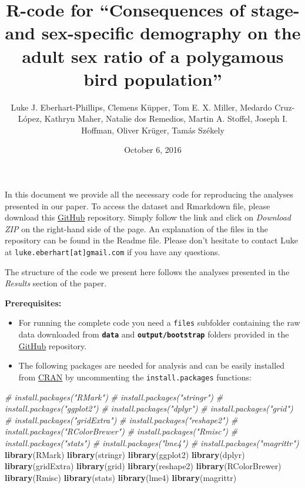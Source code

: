 \documentclass[]{article}
\title{R-code for ``Consequences of stage- and sex-specific demography on the
adult sex ratio of a polygamous bird population''}
\author{Luke J. Eberhart-Phillips, Clemens Küpper, Tom E. X. Miller, Medardo
Cruz-López, Kathryn Maher, Natalie dos Remedios, Martin A. Stoffel,
Joseph I. Hoffman, Oliver Krüger, Tamás Székely}
\date{October 6, 2016}
\newenvironment{Shaded}{\begin{snugshade}}{\end{snugshade}}
\newcommand{\KeywordTok}[1]{\textcolor[rgb]{0.13,0.29,0.53}{\textbf{{#1}}}}
\newcommand{\CommentTok}[1]{\textcolor[rgb]{0.56,0.35,0.01}{\textit{{#1}}}}
\newcommand{\NormalTok}[1]{{#1}}
\providecommand{\tightlist}{%
  \setlength{\itemsep}{0pt}\setlength{\parskip}{0pt}}
\begin{document}
\maketitle

In this document we provide all the necessary code for reproducing the
analyses presented in our paper. To access the dataset and Rmarkdown
file, please download this
\href{https://github.com/leberhartphillips/Ceuta_ASR_matrix_modeling}{GitHub}
repository. Simply follow the link and click on \emph{Download ZIP} on
the right-hand side of the page. An explanation of the files in the
repository can be found in the Readme file. Please don't hesitate to
contact Luke at \texttt{luke.eberhart{[}at{]}gmail.com} if you have any
questions.

The structure of the code we present here follows the analyses presented
in the \emph{Results} section of the paper.

\textbf{Prerequisites:}

\begin{itemize}
\tightlist
\item
  For running the complete code you need a \texttt{files} subfolder
  containing the raw data downloaded from \textbf{\texttt{data}} and
  \textbf{\texttt{output/bootstrap}} folders provided in the
  \href{https://github.com/leberhartphillips/Ceuta_ASR_matrix_modeling}{GitHub}
  repository.
\item
  The following packages are needed for analysis and can be easily
  installed from \href{http://cran.r-project.org/}{CRAN} by uncommenting
  the \texttt{install.packages} functions:
\end{itemize}

\begin{Shaded}
\begin{Highlighting}[]
\CommentTok{# install.packages("RMark")}
\CommentTok{# install.packages("stringr")}
\CommentTok{# install.packages("ggplot2")}
\CommentTok{# install.packages("dplyr")}
\CommentTok{# install.packages("grid")}
\CommentTok{# install.packages("gridExtra")}
\CommentTok{# install.packages("reshape2")}
\CommentTok{# install.packages("RColorBrewer")}
\CommentTok{# install.packages("Rmisc")}
\CommentTok{# install.packages("stats")}
\CommentTok{# install.packages("lme4")}
\CommentTok{# install.packages("magrittr")}
\KeywordTok{library}\NormalTok{(RMark) }
\KeywordTok{library}\NormalTok{(stringr)}
\KeywordTok{library}\NormalTok{(ggplot2)}
\KeywordTok{library}\NormalTok{(dplyr)}
\KeywordTok{library}\NormalTok{(gridExtra)}
\KeywordTok{library}\NormalTok{(grid)}
\KeywordTok{library}\NormalTok{(reshape2)}
\KeywordTok{library}\NormalTok{(RColorBrewer)}
\KeywordTok{library}\NormalTok{(Rmisc)}
\KeywordTok{library}\NormalTok{(stats)}
\KeywordTok{library}\NormalTok{(lme4)}
\KeywordTok{library}\NormalTok{(magrittr)}
\end{Highlighting}
\end{Shaded}
\end{document}
